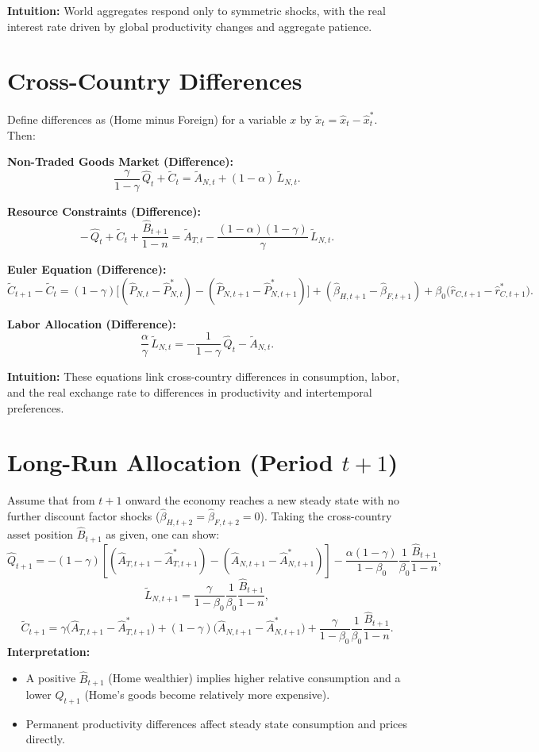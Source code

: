 \documentclass[a4paper,12pt]{article} %
\theoremstyle{nonitalic}
\begin{document}
\textbf{Intuition:} World aggregates respond only to symmetric shocks, with the real interest rate driven by global productivity changes and aggregate patience.

\section{Cross-Country Differences}

Define differences as (Home minus Foreign) for a variable $ x $ by $ \tilde{x}_t = \hat{x}_t - \hat{x}^*_t $. Then:

\textbf{Non-Traded Goods Market (Difference):}
\[
\frac{\gamma}{1-\gamma}\,\hat{Q}_t + \tilde{C}_t = \tilde{A}_{N,t} + (1-\alpha)\,\tilde{L}_{N,t}. \tag{9a}
\]

\textbf{Resource Constraints (Difference):}
\[
-\,\hat{Q}_t + \tilde{C}_t + \frac{\hat{B}_{t+1}}{1-n} = \tilde{A}_{T,t} - \frac{(1-\alpha)(1-\gamma)}{\gamma}\,\tilde{L}_{N,t}. \tag{9b}
\]

\textbf{Euler Equation (Difference):}
\[
\tilde{C}_{t+1}-\tilde{C}_t = (1-\gamma)\Big[(\hat{P}_{N,t}-\hat{P}^*_{N,t}) - (\hat{P}_{N,t+1}-\hat{P}^*_{N,t+1})\Big] + (\hat{\beta}_{H,t+1}-\hat{\beta}_{F,t+1}) + \beta_0\Big(\hat{r}_{C,t+1}-\hat{r}^*_{C,t+1}\Big). \tag{9c}
\]

\textbf{Labor Allocation (Difference):}
\[
\frac{\alpha}{\gamma}\,\tilde{L}_{N,t} = -\frac{1}{1-\gamma}\,\hat{Q}_t - \tilde{A}_{N,t}. \tag{9d}
\]

\textbf{Intuition:} These equations link cross-country differences in consumption, labor, and the real exchange rate to differences in productivity and intertemporal preferences.

\section{Long-Run Allocation (Period $t+1$)}

Assume that from $ t+1 $ onward the economy reaches a new steady state with no further discount factor shocks ($ \hat{\beta}_{H,t+2} = \hat{\beta}_{F,t+2} = 0 $). Taking the cross-country asset position $ \hat{B}_{t+1} $ as given, one can show:
\[
\hat{Q}_{t+1} = - (1-\gamma)\left[(\hat{A}_{T,t+1}-\hat{A}^*_{T,t+1}) - (\hat{A}_{N,t+1}-\hat{A}^*_{N,t+1})\right] - \frac{\alpha(1-\gamma)}{1-\beta_0}\frac{1}{\beta_0}\frac{\hat{B}_{t+1}}{1-n},
\]
\[
\tilde{L}_{N,t+1} = \frac{\gamma}{1-\beta_0}\frac{1}{\beta_0}\frac{\hat{B}_{t+1}}{1-n},
\]
\[
\tilde{C}_{t+1} = \gamma\big(\hat{A}_{T,t+1}-\hat{A}^*_{T,t+1}\big) + (1-\gamma)\big(\hat{A}_{N,t+1}-\hat{A}^*_{N,t+1}\big) + \frac{\gamma}{1-\beta_0}\frac{1}{\beta_0}\frac{\hat{B}_{t+1}}{1-n}.
\]
\textbf{Interpretation:}
\begin{itemize}
    \item A positive $ \hat{B}_{t+1} $ (Home wealthier) implies higher relative consumption and a lower $ Q_{t+1} $ (Home’s goods become relatively more expensive).
    \item Permanent productivity differences affect steady state consumption and prices directly.
\end{itemize}
\end{document}
